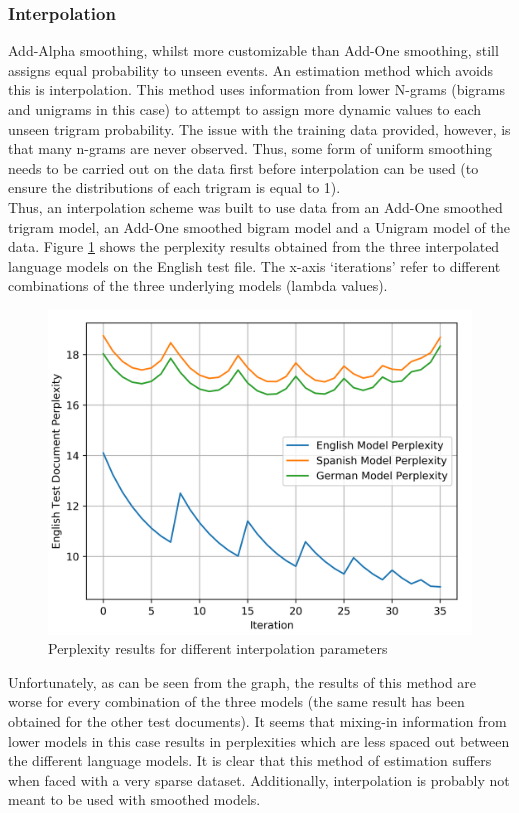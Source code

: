 \documentclass[12pt]{article}
\begin{document}
\subsubsection{Interpolation}
Add-Alpha smoothing, whilst more customizable than Add-One smoothing, still assigns equal probability to unseen events.  An estimation method which avoids this is interpolation.  This method uses information from lower N-grams (bigrams and unigrams in this case) to attempt to assign more dynamic values to each unseen trigram probability.  The issue with the training data provided, however, is that many n-grams are never observed.  Thus, some form of uniform smoothing needs to be carried out on the data first before interpolation can be used (to ensure the distributions of each trigram is equal to 1).\\
\hfill\break
Thus, an interpolation scheme was built to use data from an Add-One smoothed trigram model, an Add-One smoothed bigram model and a Unigram model of the data.  Figure \ref{fig:interpchangesenglish} shows the perplexity results obtained from the three interpolated language models on the English test file.  The x-axis `iterations' refer to different combinations of the three underlying models (lambda values).
\begin{figure}[H]
	\centering
	\includegraphics[width=0.7\linewidth]{graphics/interp_changes_English}
	\caption{Perplexity results for different interpolation parameters}
	\label{fig:interpchangesenglish}
\end{figure}
Unfortunately, as can be seen from the graph, the results of this method are worse for every combination of the three models (the same result has been obtained for the other test documents).  It seems that mixing-in information from lower models in this case results in perplexities which are less spaced out between the different language models.  It is clear that this method of estimation suffers when faced with a very sparse dataset.  Additionally, interpolation is probably not meant to be used with smoothed models.
\end{document}
